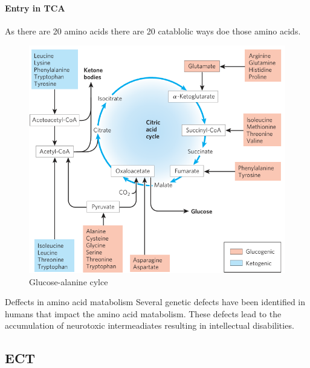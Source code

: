 \documentclass[../main.tex]{subfiles}
\begin{document}
\paragraph{Entry in TCA}
As there are 20 amino acids there are 20 catablolic ways doe those amino acids. 
\begin{figure}[H]
	\centering
	\includegraphics[width = 0.7 \textwidth]{AA2_4}
	\caption{Glucose-alanine cylce}
\end{figure}  

\begin{RemarkWithTitel}{Deffects in amino acid matabolism}
	Several genetic defects have been identified in humans that impact the amino acid matabolism. These defects lead to the accumulation of neurotoxic intermeadiates resulting in intellectual disabilities. 
\end{RemarkWithTitel}




\subsection{ECT}
\end{document}
